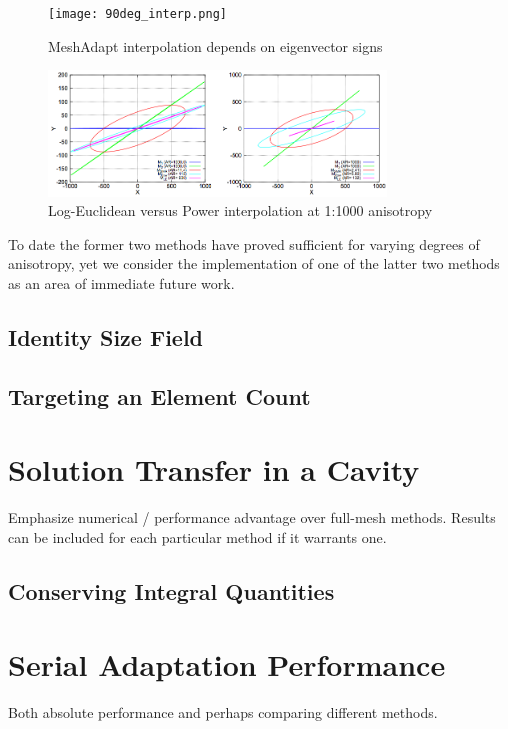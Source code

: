 \begin{figure}
\begin{center}
\texttt{[image: 90deg\_interp.png]}
\caption{MeshAdapt interpolation depends on eigenvector signs}
\label{fig:90deg_interp}
\end{center}
\end{figure}

\begin{figure}
\begin{center}
\includegraphics[width=0.8\textwidth]{log_interp.png}
\caption{Log-Euclidean versus Power interpolation
at 1:1000 anisotropy
\cite{michal2012anisotropic}}
\label{fig:log_interp}
\end{center}
\end{figure}

To date the former two methods have proved sufficient for varying
degrees of anisotropy, yet we consider the implementation of one
of the latter two methods as an area of immediate future work.

\subsection{Identity Size Field}

\subsection{Targeting an Element Count}

\section{Solution Transfer in a Cavity}

Emphasize numerical / performance advantage
over full-mesh methods.
Results can be included for each particular
method if it warrants one.

\subsection{Conserving Integral Quantities}

\section{Serial Adaptation Performance}

Both absolute performance and perhaps comparing
different methods.



